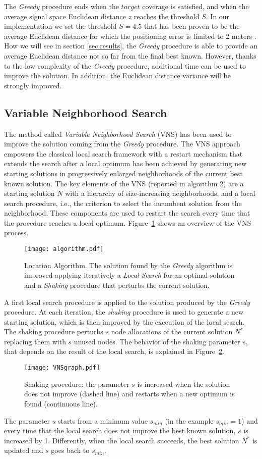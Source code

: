 The \emph{Greedy} procedure ends when the $target$ coverage is satisfied, and when the average signal space Euclidean distance $z$ reaches the threshold $S$. In our implementation we set the threshold $S=4.5$ that has been proven to be the average Euclidean distance for which the positioning error is limited to 2 meters \cite{He2011}.
How we will see in section \ref{sec:results}, the \emph{Greedy} procedure is able to provide an average Euclidean distance not so far from the final best known. However, thanks to the low complexity of the \emph{Greedy} procedure, additional time can be used to improve the solution. In addition, the Euclidean distance variance will be strongly improved.

\subsection{Variable Neighborhood Search}
The method called \emph{Variable Neighborhood Search} (VNS) has been used to improve the solution coming from the \emph{Greedy} procedure. The VNS approach empowers the classical local search framework with a restart mechanism that extends the search after a local optimum has been achieved by generating new starting solutions in progressively enlarged neighborhoods of the current best known solution. The key elements of the VNS (reported in algorithm 2) are a starting solution $N$ with a hierarchy of size-increasing neighborhoods, and a local search procedure, i.e., the criterion to select the incumbent solution from the neighborhood. These components are used to restart the search every time that the procedure reaches a local optimum.
Figure~\ref{fig:algorithm} shows an overview of the VNS process. 
\begin{figure}[h!tb]
\centering\texttt{[image: algorithm.pdf]}
\caption{Location Algorithm. The solution found by the \emph{Greedy} algorithm is improved applying iteratively a \emph{Local Search} for an optimal solution and a \emph{Shaking} procedure that perturbs the current solution.}
\label{fig:algorithm}
\end{figure}
A first local search procedure is applied to the solution produced by the \emph{Greedy} procedure. At each iteration, the \emph{shaking} procedure is used to generate a new starting solution, which is then improved by the execution of the local search. The shaking procedure perturbs \(s\) node allocations of the current solution \(N^*\) replacing them with \(s\) unused nodes. The behavior of the shaking parameter \(s\), that depends on the result of the local search, is explained in Figure~\ref{fig:shaking}. 
\begin{figure}[h!tb]
\centering\texttt{[image: VNSgraph.pdf]}
\caption{Shaking procedure: the parameter $s$ is increased when the solution does not improve (dashed line) and restarts when a new optimum is found (continuous line).}
\label{fig:shaking}
\end{figure}
The parameter \(s\) starts from a minimum value \(s_{min}\) (in the example \(s_{min} = 1 \)) and every time that the local search does not improve the best known solution, \(s\) is increased by 1. Differently, when the local search succeeds, the best solution \(N^*\) is updated and \(s\) goes back to \(s_{min}\).

